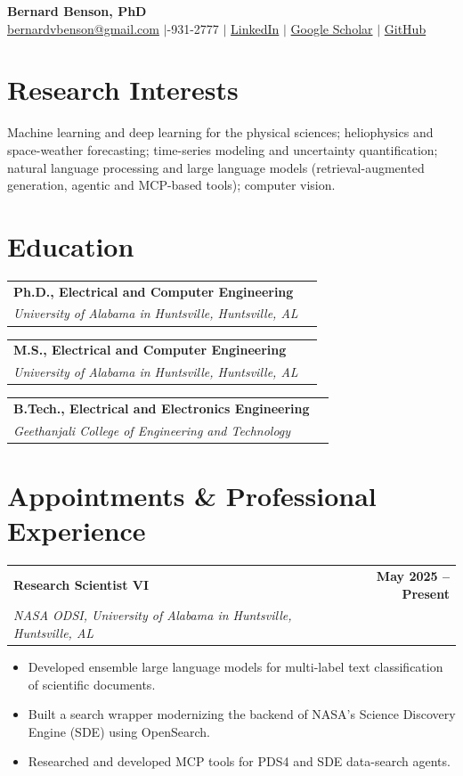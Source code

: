 \documentclass[11pt,letterpaper]{article}
\makeatletter
\newcommand{\cventry}[3]{%
  \par\vspace{0.6ex}%
  \noindent\begin{tabularx}{\textwidth}{@{}X r@{}}
    \textbf{#1} & \textbf{#3}\\
    \textit{#2} & \\
  \end{tabularx}%
  \vspace{-0.4ex}%
}
\makeatother
\begin{document}
\begin{center}
  {\LARGE\bfseries Bernard Benson, PhD}\\[0.6ex]
  {\small
    \href{mailto:bernardvbenson@gmail.com}{bernardvbenson@gmail.com}
    \;$|$-931-2777
    \;$|$\; \href{https://www.linkedin.com/in/bernardbenson}{LinkedIn}
    \;$|$\; \href{https://scholar.google.com/citations?user=uiHWfLEAAAAJ}{Google Scholar}
    \;$|$\; \href{https://github.com/bernardbenson}{GitHub}
  }
\end{center}
\vspace{0.4ex}

\section{Research Interests}
Machine learning and deep learning for the physical sciences; heliophysics and space-weather
forecasting; time-series modeling and uncertainty quantification; natural language processing
and large language models (retrieval-augmented generation, agentic and MCP-based tools);
computer vision.

\section{Education}
\cventry{Ph.D., Electrical and Computer Engineering}{University of Alabama in Huntsville, Huntsville, AL}{}

\cventry{M.S., Electrical and Computer Engineering}{University of Alabama in Huntsville, Huntsville, AL}{}

\cventry{B.Tech., Electrical and Electronics Engineering}{Geethanjali College of Engineering and Technology}{}

\section{Appointments \& Professional Experience}

\cventry{Research Scientist VI}{NASA ODSI, University of Alabama in Huntsville, Huntsville, AL}{May 2025 -- Present}
\begin{itemize}
  \item Developed ensemble large language models for multi-label text classification of scientific documents.
  \item Built a search wrapper modernizing the backend of NASA's Science Discovery Engine (SDE) using OpenSearch.
  \item Researched and developed MCP tools for PDS4 and SDE data-search agents.
\end{itemize}
\end{document}
